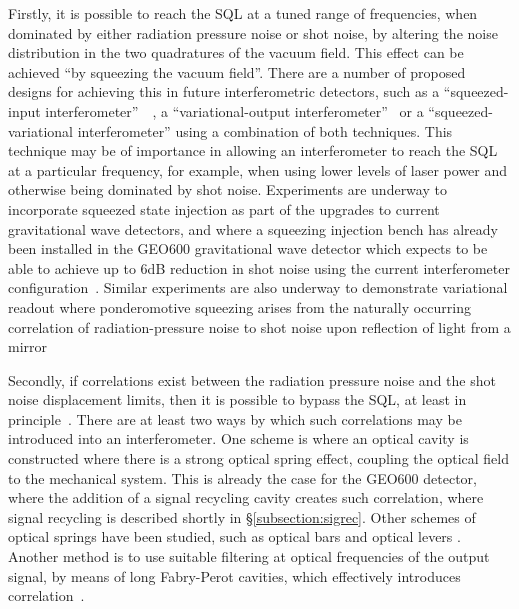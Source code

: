 \documentclass{article}
\begin{document}
Firstly, it is possible to reach the SQL at a tuned range of frequencies, when 
dominated by either radiation pressure noise or shot noise, by altering the
noise distribution in the two quadratures of the vacuum field. This effect can
be achieved ``by squeezing the vacuum field''. There are a number of proposed
designs for achieving this in future interferometric detectors, such as a
``squeezed-input interferometer''~\cite{Caves2}~\cite{Unruh:1982}, a
``variational-output interferometer''~\cite{Vyatchanin:1993} or a
``squeezed-variational interferometer'' using a combination of both techniques.
This technique may be of importance in allowing an interferometer to reach the
SQL at a particular frequency, for example, when using lower levels of laser
power and otherwise being dominated by shot noise. Experiments are underway to
incorporate squeezed state injection as part of the upgrades to current
gravitational wave detectors, and where a squeezing injection bench has already
been installed in the GEO600 gravitational wave detector which expects to be
able to achieve up to 6dB reduction in shot noise using the current
interferometer configuration~\cite{Vahlbruch:2010}. Similar experiments are also
underway to demonstrate variational readout where ponderomotive squeezing arises
from the naturally occurring correlation of radiation-pressure noise to shot
noise upon reflection of light from a mirror~\cite{Corbitt:2006,Sakata:2006}

Secondly, if correlations exist between the radiation pressure noise and the
shot noise displacement limits, then it is possible to bypass the SQL, at least
in principle~\cite{Unruh:1982}.  There are at least two ways by which such
correlations may be introduced into an interferometer.  One scheme is where an
optical cavity is constructed where there is a strong optical spring effect,
coupling the optical field to the mechanical system.  This is already the case
for the GEO600 detector, where the addition of a signal recycling cavity creates
such correlation, where signal recycling is described shortly in
\S\ref{subsection:sigrec}. Other schemes of optical springs have been studied,
such as optical bars and optical levers \cite{Braginsky:1996, Braginsky:1997}.
Another method is to use suitable filtering at optical frequencies of the
output signal, by means of long Fabry-Perot cavities, which effectively
introduces correlation~\cite{Kimble:2001, Corbitt:2004}.

\end{document}
